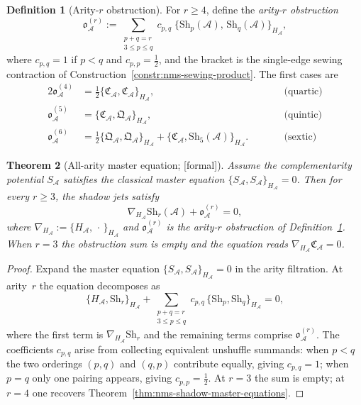 \documentclass[11pt,oneside]{memoir}
\numberwithin{equation}{chapter}
\newtheorem{theorem}{Theorem}[chapter]
\theoremstyle{definition}
\newtheorem{definition}[theorem]{Definition}
\newcommand{\ClaimStatusProvedHere}{\textnormal{[formal]}}
\newcommand{\cA}{\mathcal A}
\begin{document}
\begin{definition}[Arity-$r$ obstruction]
\label{def:nms-arity-r-obstruction}
For $r\ge 4$, define the \emph{arity-$r$ obstruction}
\begin{equation}
\label{eq:nms-arity-r-obstruction}
\mathfrak o_{\cA}^{(r)}
:=
\sum_{\substack{p+q=r \\ 3\le p\le q}}
c_{p,q}\;
\{\mathrm{Sh}_p(\cA),\,\mathrm{Sh}_q(\cA)\}_{H_{\cA}},
\end{equation}
where $c_{p,q}=1$ if $p<q$ and $c_{p,p}=\frac12$, and the bracket is the single-edge sewing contraction of Construction~\ref{constr:nms-sewing-product}.  The first cases are
\begin{alignat}{2}
\mathfrak o_{\cA}^{(4)}
&= \tfrac12\{\mathfrak C_{\cA},\mathfrak C_{\cA}\}_{H_{\cA}},
&\qquad&\text{(quartic)}
\label{eq:nms-quartic-obstruction-recalled}
\\
\mathfrak o_{\cA}^{(5)}
&= \{\mathfrak C_{\cA},\mathfrak Q_{\cA}\}_{H_{\cA}},
&\qquad&\text{(quintic)}
\label{eq:nms-quintic-obstruction}
\\
\mathfrak o_{\cA}^{(6)}
&= \tfrac12\{\mathfrak Q_{\cA},\mathfrak Q_{\cA}\}_{H_{\cA}}
+\{\mathfrak C_{\cA},\mathrm{Sh}_5(\cA)\}_{H_{\cA}}.
&\qquad&\text{(sextic)}
\label{eq:nms-sextic-obstruction}
\end{alignat}
\end{definition}

\begin{theorem}[All-arity master equation; \ClaimStatusProvedHere]
\label{thm:nms-all-arity-master-equation}
Assume the complementarity potential $S_{\cA}$ satisfies the classical master equation $\{S_{\cA},S_{\cA}\}_{H_{\cA}}=0$.  Then for every $r\ge 3$, the shadow jets satisfy
\begin{equation}
\label{eq:nms-all-arity-master-equation}
\nabla_{H_{\cA}}\mathrm{Sh}_r(\cA) + \mathfrak o_{\cA}^{(r)} = 0,
\end{equation}
where $\nabla_{H_{\cA}}:=\{H_{\cA},\,\cdot\,\}_{H_{\cA}}$ and $\mathfrak o_{\cA}^{(r)}$ is the arity-$r$ obstruction of Definition~\ref{def:nms-arity-r-obstruction}.  When $r=3$ the obstruction sum is empty and the equation reads $\nabla_{H_{\cA}}\mathfrak C_{\cA}=0$.
\end{theorem}

\begin{proof}
Expand the master equation $\{S_{\cA},S_{\cA}\}_{H_{\cA}}=0$ in the arity filtration.  At arity~$r$ the equation decomposes as
\[
\{H_{\cA},\mathrm{Sh}_r\}_{H_{\cA}}
+
\sum_{\substack{p+q=r \\ 3\le p\le q}}
c_{p,q}\,
\{\mathrm{Sh}_p,\mathrm{Sh}_q\}_{H_{\cA}}
= 0,
\]
where the first term is $\nabla_{H_{\cA}}\mathrm{Sh}_r$ and the remaining terms comprise $\mathfrak o_{\cA}^{(r)}$.  The coefficients $c_{p,q}$ arise from collecting equivalent unshuffle summands: when $p<q$ the two orderings $(p,q)$ and $(q,p)$ contribute equally, giving $c_{p,q}=1$; when $p=q$ only one pairing appears, giving $c_{p,p}=\frac12$.  At $r=3$ the sum is empty; at $r=4$ one recovers Theorem~\ref{thm:nms-shadow-master-equations}.\qedhere
\end{proof}
\end{document}
